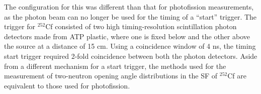 The configuration for this was different than that for photofission measurements, as the photon beam can no longer be used for the timing of a ``start'' trigger.
The trigger for $^{252}$Cf consisted of two high timing-resolution scintillation photon detectors made from ATP plastic, where one is fixed below and the other above the source at a distance of 15 cm.
Using a coincidence window of 4 ns, the timing start trigger required 2-fold coincidence between both the photon detectors.
Aside from a different mechanism for a start trigger, the methods used for the measurement of two-neutron opening angle distributions in the SF of $^{252}$Cf are equivalent to those used for photofission.


